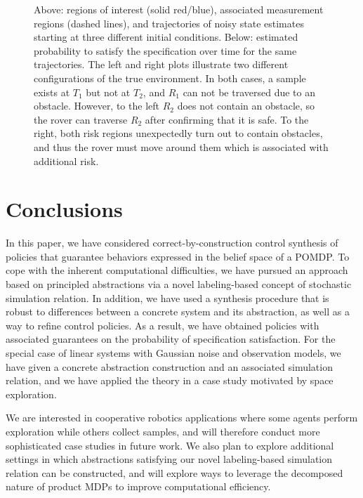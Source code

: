 \documentclass{ifacconf}
\begin{document}
\begin{figure}
  \footnotesize
  \setlength{}
  \setlength{}

  \begin{center}
       
  \end{center}

  \setlength{}
  \setlength{}

  \begin{center}
       
  \end{center}
  \caption{Above: regions of interest (solid red/blue), associated measurement regions (dashed lines), and trajectories of noisy state estimates starting at three different initial conditions. Below: estimated probability to satisfy the specification over time for the same trajectories. The left and right plots illustrate two different configurations of the true environment. In both cases, a sample exists at $T_1$ but not at $T_2$, and $R_1$ can not be traversed due to an obstacle. However, to the left $R_2$ does not contain an obstacle, so the rover can traverse $R_2$ after confirming that it is safe. To the right, both risk regions unexpectedly turn out to contain obstacles, and thus the rover must move around them which is associated with additional risk.}
  \label{fig:exp1}
\end{figure}


\section{Conclusions}
\label{sec:conclusions}

In this paper,  we have considered correct-by-construction control synthesis of policies that guarantee behaviors expressed in the belief space of a POMDP. To cope with the inherent computational difficulties, we have pursued an approach based on principled abstractions via a novel labeling-based concept of stochastic simulation relation. In addition, we have used a synthesis procedure that is robust to differences between a concrete system and its abstraction, as well as a way to refine control policies. As a result, we have obtained policies with associated guarantees on the probability of specification satisfaction. For the special case of linear systems with Gaussian noise and observation models, we have given a concrete abstraction construction and an associated simulation relation, and we have applied the theory in a case study motivated by space exploration.

We are interested in cooperative robotics applications where some agents perform exploration while others collect samples, and will therefore conduct more sophisticated case studies in future work. We also plan to explore additional settings in which abstractions satisfying our novel labeling-based simulation relation can be constructed, and will explore ways to leverage the decomposed nature of product MDPs to improve computational efficiency.


\end{document}

